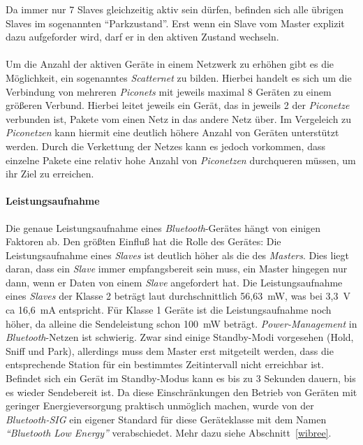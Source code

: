                 Da immer nur 7 Slaves gleichzeitig aktiv sein dürfen, befinden sich 
                alle übrigen Slaves im sogenannten "`Parkzustand"'. Erst wenn
                ein Slave vom Master explizit dazu aufgeforder wird, darf er in den
                aktiven Zustand wechseln. \\
                \\
                Um die Anzahl der aktiven Geräte in einem Netzwerk zu erhöhen
                gibt es die Möglichkeit, ein sogenanntes \emph{Scatternet} zu bilden.
                Hierbei handelt es sich um die Verbindung von mehreren \emph{Piconets}
                mit jeweils maximal 8 Geräten zu einem größeren Verbund. Hierbei
                leitet jeweils ein Gerät, das in jeweils 2 der \emph{Piconetze}
                verbunden ist, Pakete vom einen Netz in das andere Netz über.
                Im Vergeleich zu \emph{Piconetzen} kann hiermit eine deutlich höhere
                Anzahl von Geräten unterstützt werden. Durch die Verkettung 
                der Netzes kann es jedoch vorkommen, dass einzelne Pakete
                eine relativ hohe Anzahl von \emph{Piconetzen} durchqueren müssen,
                um ihr Ziel zu erreichen.
            \paragraph{Leistungsaufnahme}
                Die genaue Leistungsaufnahme eines \emph{Bluetooth}-Gerätes hängt von 
                einigen Faktoren ab. Den größten Einfluß hat die Rolle des 
                Gerätes: Die Leistungsaufnahme eines \emph{Slaves} ist
                deutlich höher als die des \emph{Masters}. Dies liegt
                daran, dass ein \emph{Slave} immer empfangsbereit sein
                muss, ein Master hingegen nur dann, wenn er Daten von
                einem \emph{Slave} angefordert hat. Die Leistungsaufnahme
                eines \emph{Slaves} der Klasse 2 beträgt laut \cite{BluetoothPower}
                durchschnittlich 56,63~mW, was bei 3,3~V ca 16,6~mA entspricht.
                Für Klasse 1 Geräte ist die Leistungsaufnahme noch höher, 
                da alleine die Sendeleistung schon 100~mW beträgt.
                \emph{Power-Management} in \emph{Bluetooth}-Netzen ist schwierig. Zwar sind
                einige Standby-Modi vorgesehen (Hold, Sniff und Park), allerdings
                muss dem Master erst mitgeteilt werden, dass die entsprechende
                Station für ein bestimmtes Zeitintervall nicht erreichbar ist.
                Befindet sich ein Gerät im Standby-Modus kann es bis zu 3 Sekunden
                dauern, bis es wieder Sendebereit ist. Da diese Einschränkungen
                den Betrieb von Geräten mit geringer Energieversorgung
                praktisch unmöglich machen, wurde von der \emph{Bluetooth-SIG}
                ein eigener Standard für diese Geräteklasse mit dem Namen
                \emph{"`Bluetooth Low Energy"'} verabschiedet. Mehr dazu siehe
                Abschnitt~\ref{wibree}.

